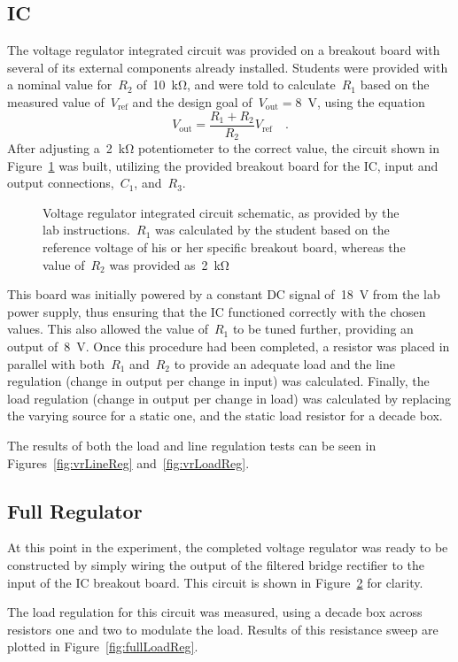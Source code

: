\subsection{IC}
The voltage regulator integrated circuit was provided on a breakout board with
several of its external components already installed.  Students were provided
with a nominal value for~$R_2$ of~\SI{10}{\kilo\ohm}, and were told to
calculate~$R_1$ based on the measured value of~$V_\text{ref}$ and the design
goal of~$V_\text{out} = $\SI{8}{\volt}, using the equation
%
\begin{equation}
	V_\text{out} = \frac{R_1 + R_2}{R_2} V_\text{ref} \quad \text{.}
	\label{eq:calcR1}
\end{equation}
%
After adjusting a~\SI{2}{\kilo\ohm} potentiometer to the correct value, the
circuit shown in Figure~\ref{fig:icSchem} was built, utilizing the provided
breakout board for the IC, input and output connections,~$C_1$, and~$R_3$.
%
\begin{figure}[H]
	\centering
	
	\parbox{.6\textwidth}{
	\caption{Voltage regulator integrated circuit schematic, as provided by the
	lab instructions.~$R_1$ was calculated by the student based on the
	reference voltage of his or her specific breakout board, whereas the value
	of~$R_2$ was provided as~\SI{2}{\kilo\ohm}}
	\label{fig:icSchem}
	}
\end{figure}
%
This board was initially powered by a constant DC signal of~\SI{18}{\volt} from
the lab power supply, thus ensuring that the IC functioned correctly with the
chosen values.  This also allowed the value of~$R_1$ to be tuned further,
providing an output of~\SI{8}{\volt}.  Once this procedure had been completed,
a resistor was placed in parallel with both~$R_1$ and~$R_2$ to provide an
adequate load and the line regulation (change in output per change in input)
was calculated.  Finally, the load regulation (change in output per change in
load) was calculated by replacing the varying source for a static one, and the
static load resistor for a decade box.

The results of both the load and line regulation tests can be seen in
Figures~\ref{fig:vrLineReg} and~\ref{fig:vrLoadReg}.

\subsection{Full Regulator}
At this point in the experiment, the completed voltage regulator was ready to
be constructed by simply wiring the output of the filtered bridge rectifier to
the input of the IC breakout board.  This circuit is shown in
Figure~\ref{fig:fullSchem} for clarity.
%
\begin{figure}[H]
	\centering
	
	\caption{}
	\label{fig:fullSchem}
\end{figure}
%
The load regulation for this circuit was measured, using a decade box across
resistors one and two to modulate the load.  Results of this resistance sweep
are plotted in Figure~\ref{fig:fullLoadReg}.
